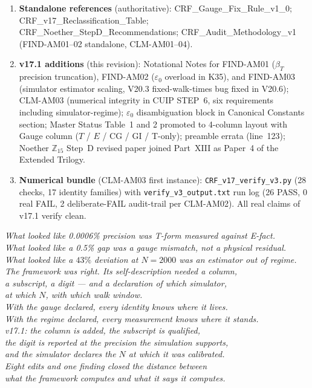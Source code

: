 \documentclass[12pt, a4paper]{article}
\begin{document}
\begin{enumerate}[leftmargin=*]
  (conventionally cited $\sim 800\times$); Layers 1 and 3 clarified.
\item \textbf{Standalone references} (authoritative): \sloppy
  CRF\_Gauge\_Fix\_Rule\_v1\_0;
  CRF\_v17\_Reclassification\_Table;
  CRF\_Noether\_StepD\_Recommendations;
  CRF\_Audit\_Methodology\_v1 (FIND-AM01--02 standalone, CLM-AM01--04).
\item \textbf{v17.1 additions} (this revision): Notational Notes for
  FIND-AM01 ($\beta_T$ precision truncation), FIND-AM02
  ($\varepsilon_0$ overload in K35), and FIND-AM03 (simulator
  estimator scaling, V20.3 fixed-walk-times bug fixed in V20.6);
  CLM-AM03 (numerical integrity in CUIP STEP~6, six requirements
  including simulator-regime); $\varepsilon_0$ disambiguation block
  in Canonical Constants section; Master Status Table~1 and 2
  promoted to 4-column layout with Gauge column ($T$ / $E$ / CG /
  GI / T-only); preamble errata (line~123); Noether $\mathbb{Z}_{15}$
  Step~D revised paper joined Part~XIII as Paper~4 of the Extended
  Trilogy.
\item \textbf{Numerical bundle} (CLM-AM03 first instance):
  \texttt{CRF\_v17\_verify\_v3.py} (28 checks, 17 identity families)
  with \texttt{verify\_v3\_output.txt} run log (26 PASS, 0 real FAIL,
  2 deliberate-FAIL audit-trail per CLM-AM02). All real claims of
  v17.1 verify clean.
\end{enumerate}

\bigskip
\begin{center}
\textit{What looked like 0.0006\% precision was T-form measured against E-fact.\\
What looked like a 0.5\% gap was a gauge mismatch, not a physical residual.\\
What looked like a $43\%$ deviation at $N=2000$ was an estimator out of regime.\\
The framework was right. Its self-description needed a column,\\
a subscript, a digit --- and a declaration of which simulator,\\
at which $N$, with which walk window.\\[6pt]
With the gauge declared, every identity knows where it lives.\\
With the regime declared, every measurement knows where it stands.\\[6pt]
v17.1: the column is added, the subscript is qualified,\\
the digit is reported at the precision the simulation supports,\\
and the simulator declares the $N$ at which it was calibrated.\\
Eight edits and one finding closed the distance between\\
what the framework computes and what it says it computes.}
\end{center}
\end{document}
